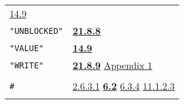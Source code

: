 \documentclass[a4paper,]{article}
\begin{document}
\begin{longtable}[]{@{}ll@{}}
\begin{minipage}[t]{0.70\columnwidth}
\href{14-data-type-declarations.md\#149-the-rsubr-decl}{14.9}\strut
\end{minipage}\tabularnewline
\begin{minipage}[t]{0.24\columnwidth}\raggedright\strut
\texttt{"UNBLOCKED"}\strut
\end{minipage} & \begin{minipage}[t]{0.70\columnwidth}\raggedright\strut
\textbf{\href{21-interrupts.md\#2188-unblocked}{21.8.8}}\strut
\end{minipage}\tabularnewline
\begin{minipage}[t]{0.24\columnwidth}\raggedright\strut
\texttt{"VALUE"}\strut
\end{minipage} & \begin{minipage}[t]{0.70\columnwidth}\raggedright\strut
\textbf{\href{14-data-type-declarations.md\#149-the-rsubr-decl}{14.9}}\strut
\end{minipage}\tabularnewline
\begin{minipage}[t]{0.24\columnwidth}\raggedright\strut
\texttt{"WRITE"}\strut
\end{minipage} & \begin{minipage}[t]{0.70\columnwidth}\raggedright\strut
\textbf{\href{21-interrupts.md\#2189-read-and-write}{21.8.9}}
\href{appendix-1-a-look-inside.md\#appendix-1-a-look-inside}{Appendix 1}\strut
\end{minipage}\tabularnewline
\begin{minipage}[t]{0.24\columnwidth}\raggedright\strut
\strut
\end{minipage} & \begin{minipage}[t]{0.70\columnwidth}\raggedright\strut
\strut
\end{minipage}\tabularnewline
\begin{minipage}[t]{0.24\columnwidth}\raggedright\strut
\texttt{\#}\strut
\end{minipage} & \begin{minipage}[t]{0.70\columnwidth}\raggedright\strut
\href{02-read-evaluate-print.md\#2631-non-pnames}{2.6.3.1}
\textbf{\href{06-data-types.md\#62-printed-representation-1}{6.2}} \href{06-data-types.md\#634-chtype-1}{6.3.4}
\href{11-input-output.md\#11123-princ}{11.1.2.3}\strut
\end{minipage}\tabularnewline
\begin{minipage}[t]{0.24\columnwidth}\raggedright\strut
\strut
\end{minipage} & \begin{minipage}[t]{0.70\columnwidth}\raggedright\strut

\end{minipage}
\end{longtable}
\end{document}
